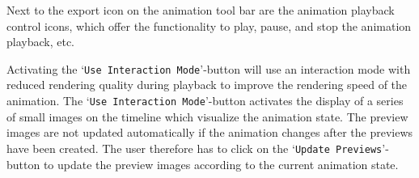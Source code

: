 Next to the export icon on the animation tool bar are the animation playback control icons, which offer the functionality to play, pause, and stop the animation playback, etc.

Activating the `\verb|Use Interaction Mode|'-button will use an interaction mode with reduced rendering quality during playback to improve the rendering speed 
of the animation. The `\verb|Use Interaction Mode|'-button activates the display of a series of small images on the timeline which visualize the animation state.
The preview images are not updated automatically if the animation changes after the previews have been created. 
The user therefore has to click on the `\verb|Update Previews|'-button to update
the preview images according to the current animation state.


\newpage 


